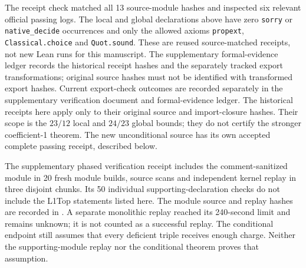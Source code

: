 The receipt check matched all 13 source-module hashes and inspected six relevant official passing logs. The local and global declarations above have zero \texttt{sorry} or \texttt{native\_decide} occurrences and only the allowed axioms \texttt{propext}, \texttt{Classical.choice} and \texttt{Quot.sound}. These are reused source-matched receipts, not new Lean runs for this manuscript. The supplementary formal-evidence ledger records the historical receipt hashes and the separately tracked export transformations; original source hashes must not be identified with transformed export hashes. Current export-check outcomes are recorded separately in the supplementary verification document and formal-evidence ledger. The historical receipts here apply only to their original source and import-closure hashes. Their scope is the $23/12$ local and $24/23$ global bounds; they do not certify the stronger coefficient-1 theorem. The new unconditional source has its own accepted complete passing receipt, described below.


The supplementary phased verification receipt includes the comment-sanitized  module in 20 fresh module builds, source scans and independent kernel replay in three disjoint chunks. Its 50 individual supporting-declaration checks do not include the L1Top statements listed here. The module source and replay hashes are recorded in . A separate monolithic replay reached its 240-second limit and remains unknown; it is not counted as a successful replay. The conditional endpoint still assumes that every deficient triple receives enough charge. Neither the supporting-module replay nor the conditional theorem proves that assumption.

